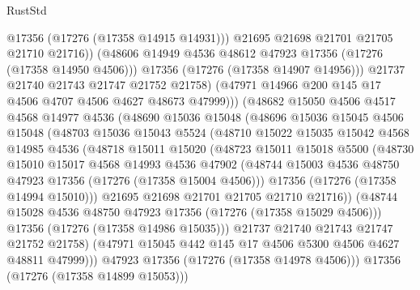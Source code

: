 \begin{lexlean}{RustStd}
\begin{coremodule}
                        @17356
                        (@17276 (@17358 @14915 @14931)))
                      @21695
                      @21698
                      @21701
                      @21705
                      @21710
                      @21716))
                  (@48606 @14949 @4536 @48612 @47923 @17356 (@17276 (@17358 @14950 @4506)))
                  @17356
                  (@17276 (@17358 @14907 @14956)))
                @21737
                @21740
                @21743
                @21747
                @21752
                @21758)
              (@47971 @14966 @200 @145 @17 @4506 @4707 @4506 @4627 @48673 @47999)))
          (@48682
            @15050
            @4506
            @4517
            @4568
            @14977
            @4536
            (@48690
              @15036
              @15048
              (@48696
                @15036
                @15045
                @4506
                @15048
                (@48703
                  @15036
                  @15043
                  @5524
                  (@48710
                    @15022
                    @15035
                    @15042
                    @4568
                    @14985
                    @4536
                    (@48718
                      @15011
                      @15020
                      (@48723
                        @15011
                        @15018
                        @5500
                        (@48730
                          @15010
                          @15017
                          @4568
                          @14993
                          @4536
                          @47902
                          (@48744 @15003 @4536 @48750 @47923 @17356 (@17276 (@17358 @15004 @4506)))
                          @17356
                          (@17276 (@17358 @14994 @15010)))
                        @21695
                        @21698
                        @21701
                        @21705
                        @21710
                        @21716))
                    (@48744 @15028 @4536 @48750 @47923 @17356 (@17276 (@17358 @15029 @4506)))
                    @17356
                    (@17276 (@17358 @14986 @15035)))
                  @21737
                  @21740
                  @21743
                  @21747
                  @21752
                  @21758)
                (@47971 @15045 @442 @145 @17 @4506 @5300 @4506 @4627 @48811 @47999)))
            @47923
            @17356
            (@17276 (@17358 @14978 @4506)))
          @17356
          (@17276 (@17358 @14899 @15053)))

\end{coremodule}
\end{lexlean}
